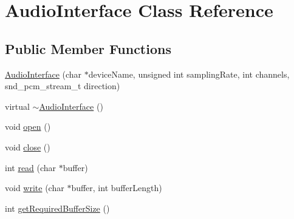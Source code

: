\hypertarget{classAudioInterface}{\section{Audio\+Interface Class Reference}
\label{classAudioInterface}
}
\subsection*{Public Member Functions}
\begin{DoxyCompactItemize}
\item 
\hyperlink{classAudioInterface_a8382ef84a72aca3eb6cc2dcc43c1f1c0}{Audio\+Interface} (char $\ast$device\+Name, unsigned int sampling\+Rate, int channels, snd\+\_\+pcm\+\_\+stream\+\_\+t direction)
\item 
virtual \hyperlink{classAudioInterface_a985204462880bbacf04c04ce538d9963}{$\sim$\+Audio\+Interface} ()
\item 
void \hyperlink{classAudioInterface_af879263299342c9c0c52a2deb906f40e}{open} ()
\item 
void \hyperlink{classAudioInterface_a6d361612b36de63f5ae9b212c3da09ed}{close} ()
\item 
int \hyperlink{classAudioInterface_aaa97099be297b43bd20e937af70ebbe3}{read} (char $\ast$buffer)
\item 
void \hyperlink{classAudioInterface_a2aa1641dc149354dfc18f1d5edd8ce0f}{write} (char $\ast$buffer, int buffer\+Length)
\item 
int \hyperlink{classAudioInterface_ae571b3fd9d14edefbd54e101eceeab89}{get\+Required\+Buffer\+Size} ()
\end{DoxyCompactItemize}


